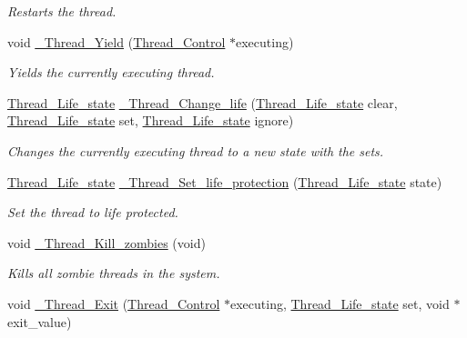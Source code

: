 \begin{DoxyCompactItemize}
\begin{DoxyCompactList}\small\item\em Restarts the thread. \end{DoxyCompactList}\item 
void \mbox{\hyperlink{group__RTEMSScoreThread_ga82c1e28e7fcc27135782ff978dcdcb8f}{\+\_\+\+Thread\+\_\+\+Yield}} (\mbox{\hyperlink{struct__Thread__Control}{Thread\+\_\+\+Control}} $\ast$executing)
\begin{DoxyCompactList}\small\item\em Yields the currently executing thread. \end{DoxyCompactList}\item 
\mbox{\hyperlink{group__RTEMSScoreThread_ga0b4c61e432a0c21855e3122bb394583d}{Thread\+\_\+\+Life\+\_\+state}} \mbox{\hyperlink{group__RTEMSScoreThread_ga7e2c11aa0d3c505d0d3e264fbb6bbe7e}{\+\_\+\+Thread\+\_\+\+Change\+\_\+life}} (\mbox{\hyperlink{group__RTEMSScoreThread_ga0b4c61e432a0c21855e3122bb394583d}{Thread\+\_\+\+Life\+\_\+state}} clear, \mbox{\hyperlink{group__RTEMSScoreThread_ga0b4c61e432a0c21855e3122bb394583d}{Thread\+\_\+\+Life\+\_\+state}} set, \mbox{\hyperlink{group__RTEMSScoreThread_ga0b4c61e432a0c21855e3122bb394583d}{Thread\+\_\+\+Life\+\_\+state}} ignore)
\begin{DoxyCompactList}\small\item\em Changes the currently executing thread to a new state with the sets. \end{DoxyCompactList}\item 
\mbox{\hyperlink{group__RTEMSScoreThread_ga0b4c61e432a0c21855e3122bb394583d}{Thread\+\_\+\+Life\+\_\+state}} \mbox{\hyperlink{group__RTEMSScoreThread_gad5aaea7af4482aebd880403fb9c238af}{\+\_\+\+Thread\+\_\+\+Set\+\_\+life\+\_\+protection}} (\mbox{\hyperlink{group__RTEMSScoreThread_ga0b4c61e432a0c21855e3122bb394583d}{Thread\+\_\+\+Life\+\_\+state}} state)
\begin{DoxyCompactList}\small\item\em Set the thread to life protected. \end{DoxyCompactList}\item 
void \mbox{\hyperlink{group__RTEMSScoreThread_ga986b5354464f933956a6ea28ba9b74a2}{\+\_\+\+Thread\+\_\+\+Kill\+\_\+zombies}} (void)
\begin{DoxyCompactList}\small\item\em Kills all zombie threads in the system. \end{DoxyCompactList}\item 
void \mbox{\hyperlink{group__RTEMSScoreThread_ga99bebb00c256fb08bd5c1bdf546c5e1f}{\+\_\+\+Thread\+\_\+\+Exit}} (\mbox{\hyperlink{struct__Thread__Control}{Thread\+\_\+\+Control}} $\ast$executing, \mbox{\hyperlink{group__RTEMSScoreThread_ga0b4c61e432a0c21855e3122bb394583d}{Thread\+\_\+\+Life\+\_\+state}} set, void $\ast$exit\+\_\+value)

\end{DoxyCompactItemize}
